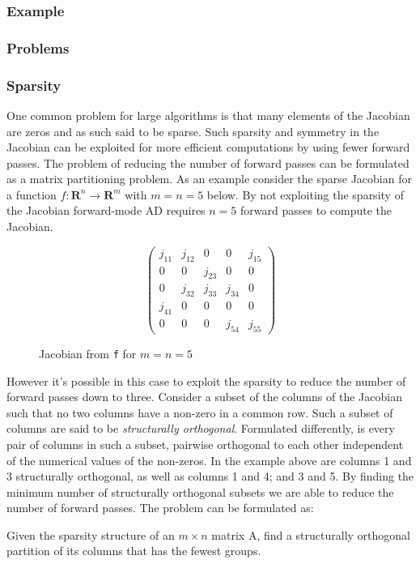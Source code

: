 \subsubsection{Example}
\subsubsection{Problems}
\subsubsection{Sparsity}
One common problem for large algorithms is that many elements of the Jacobian
are zeros and as such said to be sparse. Such sparsity and symmetry in the Jacobian can 
be exploited for more efficient computations by using fewer forward passes. The problem
of reducing the number of forward passes can be formulated as a matrix partitioning problem. 
As an example consider the sparse Jacobian for a function $f: \mathbf{R}^n \to  \mathbf{R}^m$ with $m=n=5$ below. By not exploiting the sparsity of the Jacobian forward-mode AD requires $n=5$ forward passes to compute the Jacobian.
\begin{figure}[H]
	$$ \left(\begin{matrix}
    j_{11} & j_{12} & 0 & 0 & j_{15} \\
    0 & 0 & j_{23} & 0 & 0 \\
    0 & j_{32} & j_{33} & j_{34} & 0 \\
    j_{41} & 0 & 0 & 0 & 0 \\
    0 & 0 & 0 & j_{54} & j_{55} 
	\end{matrix}\right) $$
	\caption{Jacobian from \texttt{f} for $m=n=5$}
\end{figure}
However it's possible in this case to exploit the sparsity to reduce the number of forward passes down to three. Consider a subset of the columns of the Jacobian such that no two columns have a non-zero in a common row. Such a subset of columns are said to be \emph{structurally orthogonal}. Formulated differently, is every pair of columns in such a subset, pairwise orthogonal to each other independent of the numerical values of the non-zeros. In the example above are columns 1 and 3 structurally orthogonal, as well as columns 1 and 4; and 3 and 5. By finding the minimum number of structurally orthogonal subsets we are able to reduce the number of forward passes. 
The problem can be formulated as:
\begin{problem}
	Given the sparsity structure of an $m \times n$ matrix A, find a structurally orthogonal partition of its columns that has the fewest groups.
	\label{prob:p1}
\end{problem}
